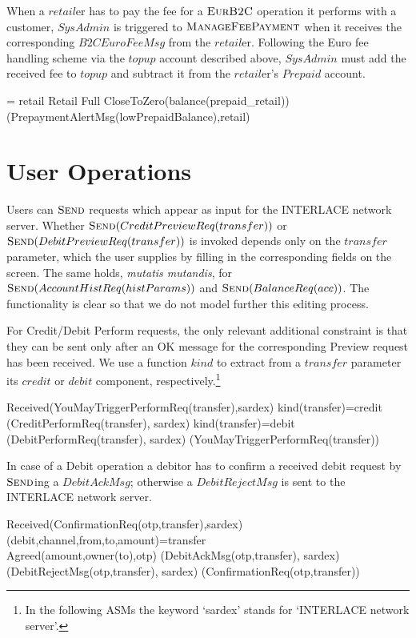 When a $retail$er has to pay the fee for a $\hbox{\sc EurB2C}$ operation it performs with a customer, $SysAdmin$ is triggered to $\hbox{\sc ManageFeePayment}$ when it receives the corresponding $B2CEuroFeeMsg$ from the $retail$er. Following the Euro fee handling scheme via the $topup$ account described above, $SysAdmin$ must add the received fee to $topup$ and subtract it from the $retail$er's $Prepaid$ account.

\begin{asm}
=\+
  \FORALL  retail  \in Retail \cup Full \+
     \IF CloseToZero(balance(prepaid_{retail}))  \THEN \+
        (PrepaymentAlertMsg(lowPrepaidBalance),\TO retail)
\end{asm}
\section{User Operations}
\label{sect:usrops}
Users can $\hbox{\sc Send}$ requests which appear as input for the INTERLACE network server. Whether $\hbox{\sc Send}(CreditPreviewReq(transfer))$ or $\hbox{\sc Send}(DebitPreviewReq(transfer))$ is invoked depends only on the $transfer$ parameter, which the user supplies by filling in the corresponding fields on the screen. The same holds, \emph{mutatis mutandis}, for $\hbox{\sc Send}(AccountHistReq(histParams))$ and $\hbox{\sc Send}(BalanceReq(acc))$. The functionality is clear so that we do not model further this editing process.

For Credit/Debit Perform requests, the only relevant additional constraint is that they can be sent only after an OK message for the corresponding Preview request has been received. We use a function $kind$ to extract from a $transfer$ parameter its $credit$ or $debit$ component, respectively.\footnote{In the following ASMs the keyword `sardex' stands for `INTERLACE network server'.}

\begin{asm}
\IF Received(YouMayTriggerPerformReq(transfer),\FROM sardex) \THEN \+
\IF kind(transfer)=credit \THEN \+
(CreditPerformReq(transfer), \TO  sardex) \-
\IF kind(transfer)=debit \THEN \+
(DebitPerformReq(transfer), \TO  sardex)  \-
(YouMayTriggerPerformReq(transfer))
\end{asm}

In case of a Debit operation a debitor has to confirm a received debit request by $\hbox{\sc Send}$ing a $DebitAckMsg$; otherwise a $DebitRejectMsg$ is sent to the INTERLACE network server.
\begin{asm}
\IF Received(ConfirmationReq(otp,transfer),\FROM sardex) \THEN \+
\LET (debit,channel,from,to,amount)=transfer \\
\IF Agreed(amount,owner(to),otp) \THEN\+
(DebitAckMsg(otp,transfer), \TO sardex) \-
\ELSE ~ (DebitRejectMsg(otp,transfer), \TO sardex)\-
(ConfirmationReq(otp,transfer))
\end{asm}


